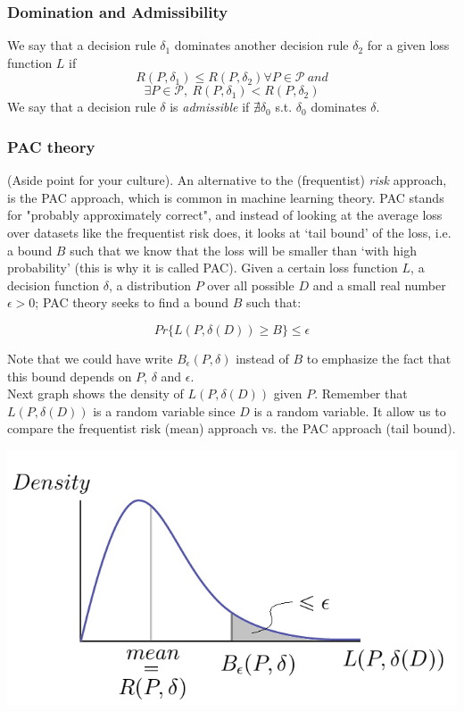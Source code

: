 \documentclass[12pt]{report}
\begin{document}
\subsubsection{Domination and Admissibility}
We say that a decision rule $\delta_1$ dominates another decision rule $\delta_2$ for a given loss function $L$ if
$$R(P,\delta_1)\leq R(P,\delta_2) \forall P \in \mathcal{P}\ and$$
$$\exists P \in \mathcal{P},\ R(P,\delta_1) < R(P, \delta_2)$$
We say that a decision rule $\delta$ is \textit{admissible} if $\nexists \delta_0$ s.t. $\delta_0$ dominates $\delta$.

\subsubsection{PAC theory}
(Aside point for your culture). An alternative to the (frequentist) \textit{risk} approach, is the PAC approach, which is common in machine learning theory. PAC stands for "probably approximately correct", and instead of looking at the average loss over datasets like the frequentist risk does, it looks at `tail bound' of the loss, i.e. a bound $B$ such that we know that the loss will be smaller than `with high probability' (this is why it is called PAC). Given a certain loss function $L$, a decision function $\delta$, a distribution $P$ over all possible $D$ and a small real number $\epsilon > 0$; PAC theory seeks to find a bound $B$ such that:

$$ Pr\{L(P,\delta(D))\geq B \} \leq \epsilon$$

Note that we could have write $B_\epsilon(P,\delta)$ instead of $B$ to emphasize the fact that this bound depends on $P$, $\delta$ and $\epsilon$.\\
Next graph shows the density of $L(P, \delta(D))$ given $P$. Remember that $L(P, \delta(D))$ is a random variable since $D$ is a random variable. It allow us to compare the frequentist risk (mean) approach vs. the PAC approach (tail bound). 

\centerline{\includegraphics[scale=0.5]{graph_3.png}}
\end{document}
